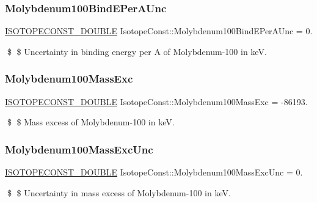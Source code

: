 \subsubsection{\texorpdfstring{Molybdenum100\+Bind\+E\+Per\+A\+Unc}{Molybdenum100BindEPerAUnc}}
{\footnotesize\ttfamily \mbox{\hyperlink{group___isotope_const-_macros_ga8f45a7272ce02c0b4c65c44636ed719a}{I\+S\+O\+T\+O\+P\+E\+C\+O\+N\+S\+T\+\_\+\+D\+O\+U\+B\+LE}} Isotope\+Const\+::\+Molybdenum100\+Bind\+E\+Per\+A\+Unc = 0.}

\$ \$ Uncertainty in binding energy per A of Molybdenum-\/100 in keV. \mbox{\label{group___isotope_const-_molybdenum-_mo100_gaeeed4e5cee3cdc7f571f3f7c477ad178}} 
\subsubsection{\texorpdfstring{Molybdenum100\+Mass\+Exc}{Molybdenum100MassExc}}
{\footnotesize\ttfamily \mbox{\hyperlink{group___isotope_const-_macros_ga8f45a7272ce02c0b4c65c44636ed719a}{I\+S\+O\+T\+O\+P\+E\+C\+O\+N\+S\+T\+\_\+\+D\+O\+U\+B\+LE}} Isotope\+Const\+::\+Molybdenum100\+Mass\+Exc = -\/86193.}

\$ \$ Mass excess of Molybdenum-\/100 in keV. \mbox{\label{group___isotope_const-_molybdenum-_mo100_ga4d82b6327aa8e0b1b14bb894fc22566a}} 
\subsubsection{\texorpdfstring{Molybdenum100\+Mass\+Exc\+Unc}{Molybdenum100MassExcUnc}}
{\footnotesize\ttfamily \mbox{\hyperlink{group___isotope_const-_macros_ga8f45a7272ce02c0b4c65c44636ed719a}{I\+S\+O\+T\+O\+P\+E\+C\+O\+N\+S\+T\+\_\+\+D\+O\+U\+B\+LE}} Isotope\+Const\+::\+Molybdenum100\+Mass\+Exc\+Unc = 0.}

\$ \$ Uncertainty in mass excess of Molybdenum-\/100 in keV. \mbox{\label{group___isotope_const-_molybdenum-_mo100_gad68e5d908ed30ff2b4a11ca0c8eb0a54}} 
